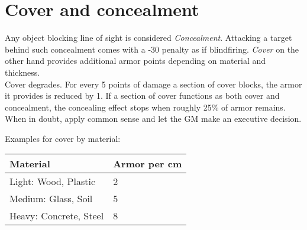 \section{Cover and concealment}
Any object blocking line of sight is considered \emph{Concealment}. Attacking a target behind such concealment comes with a -30 penalty as if blindfiring.
\emph{Cover} on the other hand provides additional armor points depending on material and thickness.
\\%
Cover degrades. For every 5 points of damage a section of cover blocks, the armor it provides is reduced by 1. If a section of cover functions as both cover and concealment, the concealing effect stops when roughly 25\% of armor remains. When in doubt, apply common sense and let the GM make an executive decision.
\par
Examples for cover by material:
\\
\begin{tabular}{ll}
	Material & Armor per cm \\ \hline
	Light: Wood, Plastic & 2 \\
	Medium: Glass, Soil & 5 \\
	Heavy: Concrete, Steel & 8
\end{tabular}
